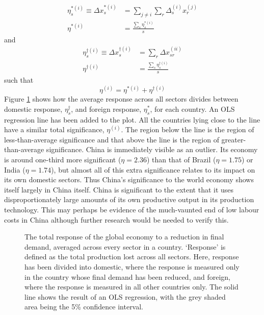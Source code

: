\documentclass[a4paper]{article}
\begin{document}
\begin{align}
\eta_s^{*(i)} \equiv \Delta x_{s}^{*(i)} & = 
	\sum_{j \neq i} \sum_r \Delta_{s}^{(i)} x_{r}^{(j)} \\
\eta^{*(i)} & = 
	\frac{\sum_s \eta_s^{*(i)}}{s}
\end{align}
and
\begin{align}
\eta_s^{\dagger(i)} \equiv \Delta x_{s}^{\dagger(i)} & = 
	\sum_r \Delta x_{sr}^{(ii)} \\
\eta^{\dagger(i)} & = 
	\frac{\sum_s \eta_s^{\dagger(i)}}{s}
\end{align}
such that
\begin{equation}
\eta^{(i)} = \eta^{*(i)} + \eta^{\dagger(i)}
\end{equation}
Figure \ref{fig:countries_domestic_vs_foreign} shows how the average response across all sectors divides between domestic response, $\eta_s^{\dagger}$, and foreign response, $\eta_s^{*}$, for each country. 
An OLS regression line has been added to the plot.
All the countries lying close to the line have a similar total significance, $\eta^{(i)}$.
The region below the line is the region of less-than-average significance and that above the line is the region of greater-than-average significance.
China is immediately visible as an outlier.
Its economy is around one-third more significant ($\eta = 2.36$) than that of Brazil ($\eta = 1.75$) or India ($\eta = 1.74$), but almost all of this extra significance relates to its impact on its own domestic sectors.
Thus China's significance to the world economy shows itself largely in China itself. China is significant to the extent that it uses disproportionately large amounts of its own productive output in its production technology.
This may perhaps be evidence of the much-vaunted end of low labour costs in China  \parencite{li_end_2012, the_economist_end_2012} although further research would be needed to verify this.

\begin{figure}
\centering
\caption{The total response of the global economy to a reduction in final demand, averaged across every sector in a country. 
`Response' is defined as the total production lost across all sectors.
Here, response has been divided into domestic, where the response is measured only in the country whose final demand has been reduced, and foreign, where the response is measured in all other countries only.
The solid line shows the result of an OLS regression, with the grey shaded area being the 5\% confidence interval.}
\label{fig:countries_domestic_vs_foreign}
\end{figure}
\end{document}
